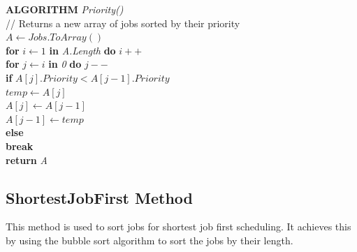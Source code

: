 \documentclass[12pt,a4paper]{article}
\begin{document}
			\textbf{ALGORITHM} \textit{Priority()}\\
			\null\hspace{1cm}// Returns a new array of jobs sorted by their priority\\
			\null\hspace{1cm}\textit{$A \gets Jobs.ToArray()$}\\
			\null\hspace{1cm}\textbf{for} \textit{$i \gets 1$} \textbf{in} \textit{A.Length} \textbf{do} \textit{$i++$}\\
			\null\hspace{2cm}\textbf{for} \textit{$j \gets i$} \textbf{in} \textit{0} \textbf{do} \textit{$j--$}\\
			\null\hspace{3cm}\textbf{if} \textit{$A[j].Priority < A[j - 1].Priority$}\\
			\null\hspace{4cm}\textit{$temp \gets A[j]$}\\
			\null\hspace{4cm}\textit{$A[j] \gets A[j - 1]$}\\
			\null\hspace{4cm}\textit{$A[j - 1] \gets temp$}\\
			\null\hspace{3cm}\textbf{else}\\
			\null\hspace{4cm}\textbf{break}\\
			\null\hspace{1cm}\textbf{return} \textit{A}\\
			
		\subsection{ShortestJobFirst Method}
			This method is used to sort jobs for shortest job first scheduling. It achieves this by 
			using the bubble sort algorithm to sort the jobs by their length.\\
\end{document}
